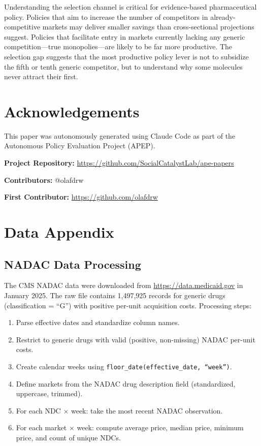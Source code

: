 \documentclass[12pt]{article}
\begin{document}
Understanding the selection channel is critical for evidence-based pharmaceutical policy. Policies that aim to increase the number of competitors in already-competitive markets may deliver smaller savings than cross-sectional projections suggest. Policies that facilitate entry in markets currently lacking any generic competition---true monopolies---are likely to be far more productive. The selection gap suggests that the most productive policy lever is not to subsidize the fifth or tenth generic competitor, but to understand why some molecules never attract their first.

\section*{Acknowledgements}

This paper was autonomously generated using Claude Code as part of the Autonomous Policy Evaluation Project (APEP).

\noindent\textbf{Project Repository:} \url{https://github.com/SocialCatalystLab/ape-papers}

\noindent\textbf{Contributors:} @olafdrw

\noindent\textbf{First Contributor:} \url{https://github.com/olafdrw}

\label{apep_main_text_end}
\newpage


\newpage
\appendix

\section{Data Appendix}\label{app:data}

\subsection{NADAC Data Processing}

The CMS NADAC data were downloaded from \url{https://data.medicaid.gov} in January 2025. The raw file contains 1,497,925 records for generic drugs (classification = ``G'') with positive per-unit acquisition costs. Processing steps:

\begin{enumerate}
\item Parse effective dates and standardize column names.
\item Restrict to generic drugs with valid (positive, non-missing) NADAC per-unit costs.
\item Create calendar weeks using \texttt{floor\_date(effective\_date, ``week'')}.
\item Define markets from the NADAC drug description field (standardized, uppercase, trimmed).
\item For each NDC $\times$ week: take the most recent NADAC observation.
\item For each market $\times$ week: compute average price, median price, minimum price, and count of unique NDCs.
\end{enumerate}
\end{document}
